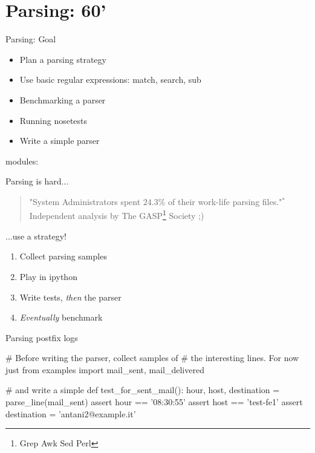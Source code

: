 \section{Parsing: 60'}

\begin{pyframe}{Parsing: Goal}
\begin{itemize}
\item Plan a parsing strategy
\item Use basic regular expressions: match, search, sub
\item Benchmarking a parser
\item Running nosetests
\item Write a simple parser
\end{itemize}
modules: 
\end{pyframe}


\begin{pyframe}{Parsing is hard...}
\begin{verse}
"System Administrators spent $24.3\%$ of
 their work-life parsing files."$^{*}$\\
\hfill *Independent analysis by The GASP\footnote{Grep Awk Sed Perl} Society ;)
\end{verse}
\end{pyframe}


\begin{pyframe}{...use a strategy!}
\begin{enumerate}
\Large
\item Collect parsing samples
\item Play in ipython
\item Write tests, \emph{then} the parser
\item \emph{Eventually} benchmark
\end{enumerate}
\end{pyframe}



\begin{pyframe}{Parsing postfix logs}
\begin{pycode}
# Before writing the parser, collect samples of
#  the interesting lines. For now just 
from examples import mail_sent, mail_delivered

# and write a simple 
def test_for_sent_mail():
    hour, host, destination = parse_line(mail_sent)
    assert hour == '08:30:55'
    assert host == 'test-fe1'
    assert destination = 'antani2@example.it'

\end{pycode}
\end{pyframe}


